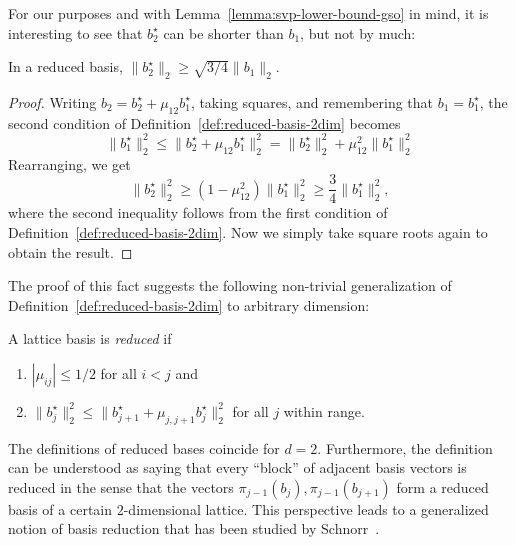 For our purposes and with Lemma~\ref{lemma:svp-lower-bound-gso} in mind,
it is interesting to see that $b_2^\star$ can be shorter than $b_1$, but not by much:
\begin{fact}
  \label{fact:reduced-basis-2dim-size-bound}
  In a reduced basis, $\|b_2^\star\|_2 \geq \sqrt{3/4} \|b_1\|_2$.
\end{fact}
\begin{proof}
  Writing $b_2 = b_2^\star + \mu_{12} b_1^\star$, taking squares,
  and remembering that $b_1 = b_1^\star$,
  the second condition of Definition~\ref{def:reduced-basis-2dim} becomes
  \[
    \|b_1^\star\|_2^2 \leq \|b_2^\star + \mu_{12} b_1^\star\|_2^2 = \|b_2^\star\|_2^2 + \mu_{12}^2 \|b_1^\star\|_2^2
  \]
  Rearranging, we get
  \[
    \|b_2^\star\|_2^2 \geq (1 - \mu_{12}^2) \|b_1^\star\|_2^2 \geq \frac{3}{4} \|b_1^\star\|_2^2,
  \]
  where the second inequality follows from the first condition of Definition~\ref{def:reduced-basis-2dim}.
  Now we simply take square roots again to obtain the result.
\end{proof}
The proof of this fact suggests the following non-trivial generalization of
Definition~\ref{def:reduced-basis-2dim} to arbitrary dimension:
\begin{definition}
  A lattice basis is \emph{reduced} if
  \begin{enumerate}
    \item $|\mu_{ij}| \leq 1/2$ for all $i < j$ and
    \item $\|b_j^\star\|_2^2 \leq \|b_{j+1}^\star + \mu_{j,j+1} b_j^\star\|_2^2$ for all $j$ within range.
  \end{enumerate}
\end{definition}

\begin{remark}
  The definitions of reduced bases coincide for $d = 2$.
  Furthermore, the definition can be understood as saying that every ``block''
  of adjacent basis vectors is reduced in the sense that the vectors
  $\pi_{j-1}(b_j), \pi_{j-1}(b_{j+1})$ form a reduced basis of a certain $2$-dimensional lattice.
  This perspective leads to a generalized notion of
  basis reduction that has been studied by Schnorr~\cite{MR918090}.
\end{remark}

